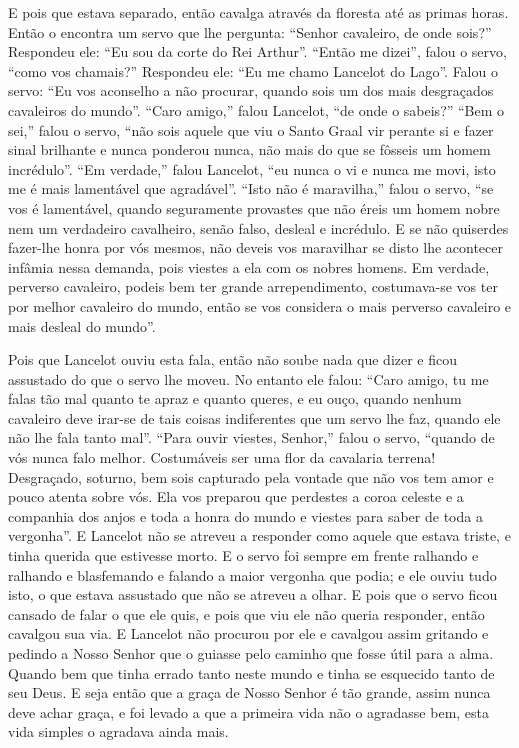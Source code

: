 E pois que estava separado, então cavalga através da floresta até as primas
horas. Então o encontra um servo que lhe pergunta: “Senhor cavaleiro, de onde
sois?” Respondeu ele: “Eu sou da corte do Rei Arthur”. “Então me dizei”, falou
o servo, “como vos chamais?” Respondeu ele: “Eu me chamo Lancelot do Lago”.
Falou o servo: “Eu vos aconselho a não procurar, quando sois um dos mais
desgraçados cavaleiros do mundo”. “Caro amigo,” falou Lancelot, “de onde o
sabeis?” “Bem o sei,” falou o servo, “não sois aquele que viu o Santo Graal
vir perante si e fazer sinal brilhante e nunca ponderou nunca, não mais do que
se fôsseis um homem incrédulo”. “Em verdade,” falou Lancelot, “eu nunca o vi e
nunca me movi, isto me é mais lamentável que agradável”. “Isto não é
maravilha,” falou o servo, “se vos é lamentável, quando seguramente provastes
que não éreis um homem nobre nem um verdadeiro cavalheiro, senão falso, desleal
e incrédulo. E se não quiserdes fazer-lhe honra por vós mesmos, não deveis vos
maravilhar se disto lhe acontecer infâmia nessa demanda, pois viestes a ela com
os nobres homens. Em verdade, perverso cavaleiro, podeis bem ter grande
arrependimento, costumava-se vos ter por melhor cavaleiro do mundo, então se
vos considera o mais perverso cavaleiro e mais desleal do mundo”. 

Pois que Lancelot ouviu esta fala, então não soube nada que dizer e ficou
assustado do que o servo lhe moveu. No entanto ele falou: “Caro amigo, tu me
falas tão mal quanto te apraz e quanto queres, e eu ouço, quando nenhum
cavaleiro deve irar-se de tais coisas indiferentes que um servo lhe faz, quando
ele não lhe fala tanto mal”. “Para ouvir viestes, Senhor,” falou o
servo, “quando de vós nunca falo melhor. Costumáveis ser uma flor da cavalaria
terrena! Desgraçado, soturno, bem sois capturado pela vontade que não vos tem
amor e pouco atenta sobre vós. Ela vos preparou que perdestes a coroa celeste e
a companhia dos anjos e toda a honra do mundo e viestes para saber de toda a
vergonha”. E Lancelot não se atreveu a responder como aquele que estava
triste, e tinha querida que estivesse morto. E o servo foi sempre em frente
ralhando e ralhando e blasfemando e falando a maior vergonha que podia; e ele
ouviu tudo isto, o que estava assustado que não se atreveu a olhar. E pois que
o servo ficou cansado de falar o que ele quis, e pois que viu ele não queria
responder, então cavalgou sua via. E Lancelot não procurou por ele e cavalgou
assim gritando e pedindo a Nosso Senhor que o guiasse pelo caminho que fosse
útil para a alma. Quando bem que tinha errado tanto neste mundo e tinha se
esquecido tanto de seu Deus. E seja então que a graça de Nosso Senhor é tão
grande, assim nunca deve achar graça, e foi levado a que a primeira vida não o
agradasse bem, esta vida simples o agradava ainda mais. 


